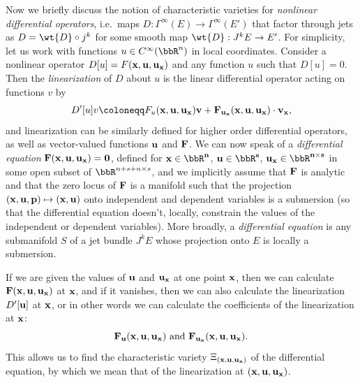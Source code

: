 Now we briefly discuss the notion of characteristic varieties for \emph{nonlinear differential operators}, i.e.\ maps $D:\Gamma^\infty(E)\to \Gamma^\infty(E')$ that factor through jets as $D=\wt{D}\circ j^k$ for some smooth map $\wt{D}:J^kE\to E'$. For simplicity, let us work with functions $u\in C^\infty(\bbR^n)$ in local coordinates. Consider a nonlinear operator $D[u]=F(\bf{x},u,u_{\bf{x}})$ and any function $u$ such that $D[u]=0$. Then the \emph{linearization} of $D$ about $u$ is the linear differential operator acting on functions $v$ by
\[D'[u]v\coloneqq F_u(\bf{x},u,u_{\bf{x}})v+F_{u_{\bf{x}}}(\bf{x},u,u_{\bf{x}})\cdot v_{\bf{x}},\]
and linearization can be similarly defined for higher order differential operators, as well as vector-valued functions $\bf{u}$ and $\bf{F}$. We can now speak of a \emph{differential equation} $\bf{F}(\bf{x},\bf{u},\bf{u}_{\bf x})=0$, defined for $\bf{x}\in\bbR^n$, $\bf{u}\in\bbR^s$, $\bf{u}_{\bf x}\in\bbR^{n\times s}$ in some open subset of $\bbR^{n+s+n\times s}$, and we implicitly assume that $\bf{F}$ is analytic and that the zero locus of $\bf{F}$ is a manifold such that the projection $(\bf{x},\bf{u},\bf{p})\mapsto (\bf{x},\bf{u})$ onto independent and dependent variables is a submersion (so that the differential equation doesn't, locally, constrain the values of the independent or dependent variables). More broadly, a \emph{differential equation} is any submanifold $S$ of a jet bundle $J^k E$ whose projection onto $E$ is locally a submersion.

If we are given the values of $\bf{u}$ and $\bf{u}_{\bf{x}}$ at one point $\bf{x}$, then we can calculate $\bf{F}(\bf{x},\bf{u},\bf{u}_{\bf x})$ at $\bf{x}$, and if it vanishes, then we can also calculate the linearization $D'[\bf{u}]$ at $\bf{x}$, or in other words we can calculate the coefficients of the linearization at $\bf{x}$:
\[\bf{F}_{\bf{u}}(\bf{x},\bf{u},\bf{u}_{\bf{x}})\text{ and }\bf{F}_{\bf{u}_{\bf{x}}}(\bf{x},\bf{u},\bf{u}_{\bf{x}}).\]
This allows us to find the characteristic variety $\Xi_{(\bf{x},\bf{u},\bf{u}_{\bf x})}$ of the differential equation, by which we mean that of the linearization at $(\bf{x},\bf{u},\bf{u}_{\bf{x}})$.

